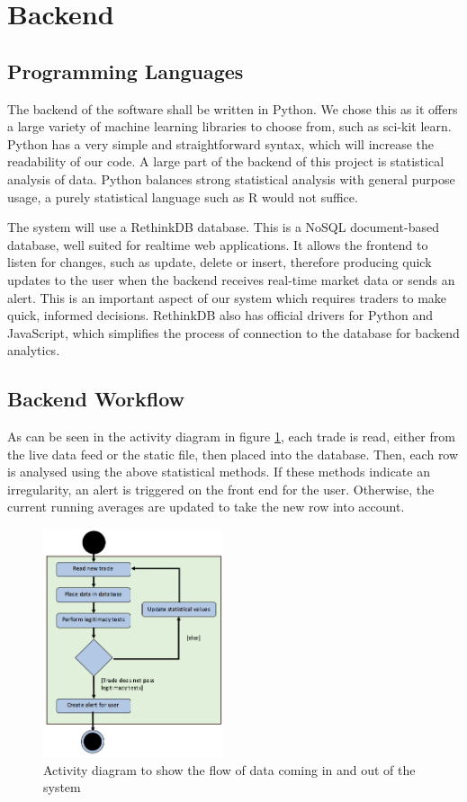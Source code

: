 \documentclass[11pt, oneside, a4paper]{article}
\begin{document}
\section{Backend}
\subsection{Programming Languages}

The backend of the software shall be written in Python. We chose this as it offers
a large variety of machine learning libraries to choose from, such as
sci-kit learn. Python has a very simple and straightforward syntax, which will
increase the readability of our code. A large part of the backend of this project
is statistical analysis of data. Python balances strong statistical analysis with
general purpose usage, a purely statistical language such as R would not suffice.

The system will use a RethinkDB database. This is a NoSQL document-based database,
well suited for realtime web applications. It allows the frontend to listen for
changes, such as update, delete or insert, therefore producing quick updates to
the user when the backend receives real-time market data or sends an alert. This
is an important aspect of our system which requires traders to make quick, informed
decisions. RethinkDB also has official drivers for Python and JavaScript, which
simplifies the process of connection to the database for backend analytics.

\subsection{Backend Workflow}

As can be seen in the activity diagram in figure \ref{ActivityDiagram},
each trade is read, either from the live data feed or the static file, then placed
into the database. Then, each row is analysed using the above statistical methods.
If these methods indicate an irregularity, an alert is triggered on the front end
for the user. Otherwise, the current running averages are updated to take the new
row into account.

\begin{figure}[h]
	\centering
		\includegraphics[width=200px]{ActivityDiagram.png}
	\caption{Activity diagram to show the flow of data coming in and out of the system}
	\label{ActivityDiagram}
\end{figure}
\end{document}
